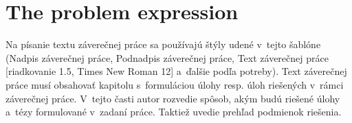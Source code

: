 \section{The problem expression}
Na písanie textu záverečnej práce sa používajú štýly udené v~tejto
šablóne (Nadpis záverečnej práce, Podnadpis záverečnej práce, Text
záverečnej práce [riadkovanie 1.5, Times New Roman 12] a~ďalšie podľa
potreby). Text záverečnej práce musí obsahovať\/ kapitolu s~formuláciou
úlohy resp. úloh riešených v~rámci záverečnej práce. V~tejto časti
autor rozvedie spôsob, akým budú riešené úlohy a~tézy formulované
v~zadaní práce. Taktiež uvedie prehľad podmienok riešenia.